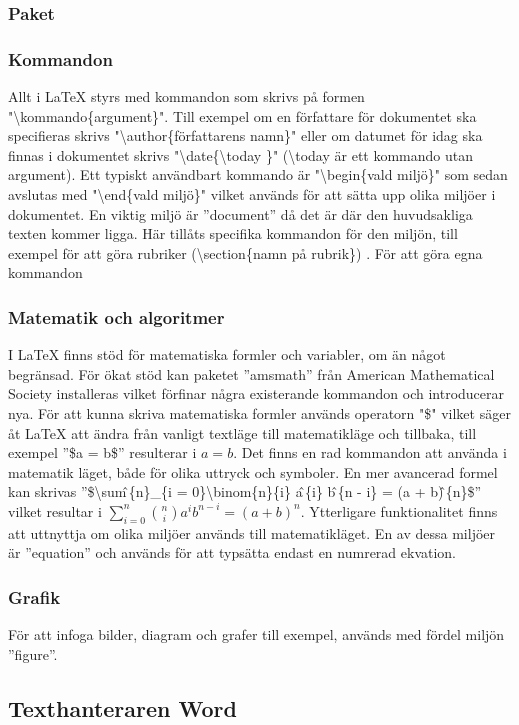 \subsubsection{Paket}

\subsubsection{Kommandon}
Allt i {\LaTeX} styrs med kommandon som skrivs på formen "\textbackslash kommando\{argument\}". Till exempel om en författare för dokumentet ska specifieras skrivs "\textbackslash author\{författarens namn\}" \hspace{0.2mm} eller om datumet för idag ska finnas i dokumentet skrivs "\textbackslash date\{\textbackslash today \}" \hspace{0.2mm} (\textbackslash today är ett kommando utan argument). Ett typiskt användbart kommando är "\textbackslash begin\{vald miljö\}" \hspace{0.2mm} som sedan avslutas med "\textbackslash end\{vald miljö\}" \hspace{0.2mm} vilket används för att sätta upp olika miljöer i dokumentet. En viktig miljö är ''document''  då det är där den huvudsakliga texten kommer ligga. Här tillåts specifika kommandon för den miljön, till exempel för att göra rubriker (\textbackslash section\{namn på rubrik\}) .
\newline
\newline
För att göra egna kommandon 

\subsubsection{Matematik och algoritmer}
I {\LaTeX} finns stöd för matematiska formler och variabler, om än något begränsad. För ökat stöd kan paketet ''amsmath'' från American Mathematical Society installeras vilket förfinar några existerande kommandon och introducerar nya. För att kunna skriva matematiska formler används operatorn "\$" \hspace{0.2mm} vilket säger åt {\LaTeX} att ändra från vanligt textläge till matematikläge och tillbaka, till exempel ''\$a = b\$'' resulterar i $a = b$. Det finns en rad kommandon att använda i matematik läget, både för olika uttryck och symboler. En mer avancerad formel kan skrivas ''\$\textbackslash sum\^ \,\{n\}\_\{i = 0\}\textbackslash binom\{n\}\{i\} a\^ \,\{i\} b\^ \,\{n - i\} = (a + b)\^ \,\{n\}\$'' vilket resultar i $\sum^{n}_{i=0}\binom{n}{i}a^{i}b^{n-i} = (a + b)^{n}$. 
\newline
\newline
Ytterligare funktionalitet finns att uttnyttja om olika miljöer används till matematikläget. En av dessa miljöer är ''equation'' och används för att typsätta endast en numrerad ekvation.     
\newline
\newline


\subsubsection{Grafik}
För att infoga bilder, diagram och grafer till exempel, används med fördel miljön ''figure''.



\subsection{Texthanteraren Word}